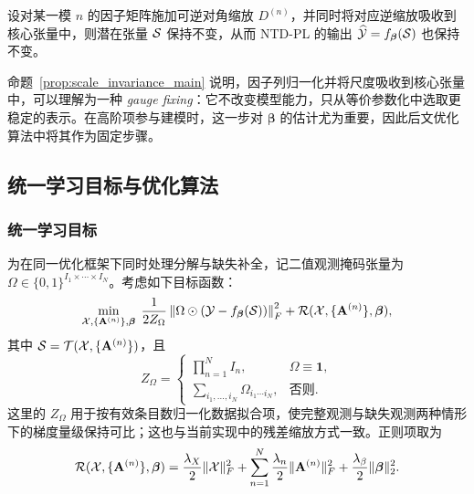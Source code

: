 \begin{proposition}[尺度不变性]
\label{prop:scale_invariance_main}
设对某一模 $n$ 的因子矩阵施加可逆对角缩放 $D^{(n)}$，并同时将对应逆缩放吸收到核心张量中，则潜在张量 $\mathcal{S}$ 保持不变，从而 NTD-PL 的输出 $\widehat{\mathcal{Y}}=f_{\boldsymbol\beta}(\mathcal{S})$ 也保持不变。
\end{proposition}

命题~\ref{prop:scale_invariance_main} 说明，因子列归一化并将尺度吸收到核心张量中，可以理解为一种 \emph{gauge fixing}：它不改变模型能力，只从等价参数化中选取更稳定的表示。在高阶项参与建模时，这一步对 $\boldsymbol\beta$ 的估计尤为重要，因此后文优化算法中将其作为固定步骤。

\subsection{统一学习目标与优化算法}

\subsubsection{统一学习目标}

为在同一优化框架下同时处理分解与缺失补全，记二值观测掩码张量为 $\Omega\in\{0,1\}^{I_1\times\cdots\times I_N}$。考虑如下目标函数：
\begin{equation}
\label{eq:ntdpl_masked_objective}
\min_{\mathcal{X},\{\mathbf A^{(n)}\},\boldsymbol\beta}
\;
\frac{1}{2Z_\Omega}
\left\|
\Omega \odot
\left(
\mathcal{Y} - f_{\boldsymbol\beta}(\mathcal{S})
\right)
\right\|_F^2
+
\mathcal R(\mathcal{X},\{\mathbf A^{(n)}\},\boldsymbol\beta),
\end{equation}
其中 $\mathcal{S}=\mathcal{T}(\mathcal{X},\{\mathbf{A}^{(n)}\})$，且
\begin{equation}
Z_\Omega =
\begin{cases}
\prod_{n=1}^{N} I_n, & \Omega \equiv \mathbf 1,\\[2mm]
\sum\limits_{i_1,\dots,i_N} \Omega_{i_1\cdots i_N}, & \text{否则}.
\end{cases}
\end{equation}
这里的 $Z_\Omega$ 用于按有效条目数归一化数据拟合项，使完整观测与缺失观测两种情形下的梯度量级保持可比；这也与当前实现中的残差缩放方式一致。正则项取为
\begin{equation}
\label{eq:ntdpl_reg_obj}
\mathcal R(\mathcal{X},\{\mathbf A^{(n)}\},\boldsymbol\beta)
=
\frac{\lambda_X}{2}\|\mathcal{X}\|_F^2
+
\sum_{n=1}^{N}\frac{\lambda_n}{2}\|\mathbf A^{(n)}\|_F^2
+
\frac{\lambda_\beta}{2}\|\boldsymbol\beta\|_2^2.
\end{equation}

